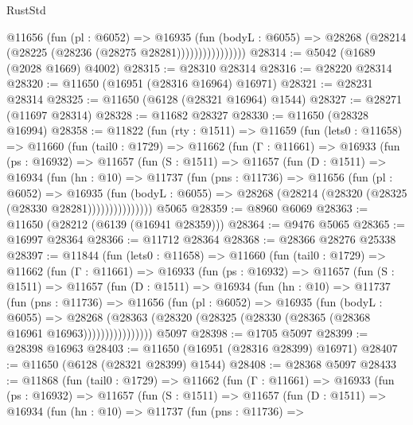 \begin{lexlean}{RustStd}
\begin{coremodule}
                      @11656
                        (fun (pl : @6052) =>
                        @16935
                          (fun (bodyL : @6055) =>
                          @28268 (@28214 (@28225 (@28236 (@28275 @28281))))))))))))))))
@28314 := @5042 (@1689 (@2028 @1669) @4002)
@28315 := @28310 @28314
@28316 := @28220 @28314
@28320 := @11650 (@16951 (@28316 @16964) @16971)
@28321 := @28231 @28314
@28325 := @11650 (@6128 (@28321 @16964) @1544)
@28327 := @28271 (@11697 @28314)
@28328 := @11682 @28327
@28330 := @11650 (@28328 @16994)
@28358 := @11822
    (fun (rty : @1511) =>
    @11659
      (fun (lets0 : @11658) =>
      @11660
        (fun (tail0 : @1729) =>
        @11662
          (fun (Γ : @11661) =>
          @16933
            (fun (ps : @16932) =>
            @11657
              (fun (S : @1511) =>
              @11657
                (fun (D : @1511) =>
                @16934
                  (fun (hn : @10) =>
                  @11737
                    (fun (pns : @11736) =>
                    @11656
                      (fun (pl : @6052) =>
                      @16935
                        (fun (bodyL : @6055) =>
                        @28268 (@28214 (@28320 (@28325 (@28330 @28281)))))))))))))))
    @5065
@28359 := @8960 @6069
@28363 := @11650 (@28212 (@6139 (@16941 @28359)))
@28364 := @9476 @5065
@28365 := @16997 @28364
@28366 := @11712 @28364
@28368 := @28366 @28276 @25338
@28397 := @11844
    (fun (lets0 : @11658) =>
    @11660
      (fun (tail0 : @1729) =>
      @11662
        (fun (Γ : @11661) =>
        @16933
          (fun (ps : @16932) =>
          @11657
            (fun (S : @1511) =>
            @11657
              (fun (D : @1511) =>
              @16934
                (fun (hn : @10) =>
                @11737
                  (fun (pns : @11736) =>
                  @11656
                    (fun (pl : @6052) =>
                    @16935
                      (fun (bodyL : @6055) =>
                      @28268
                        (@28363
                          (@28320 (@28325 (@28330 (@28365 (@28368 @16961 @16963))))))))))))))))
    @5097
@28398 := @1705 @5097
@28399 := @28398 @16963
@28403 := @11650 (@16951 (@28316 @28399) @16971)
@28407 := @11650 (@6128 (@28321 @28399) @1544)
@28408 := @28368 @5097
@28433 := @11868
    (fun (tail0 : @1729) =>
    @11662
      (fun (Γ : @11661) =>
      @16933
        (fun (ps : @16932) =>
        @11657
          (fun (S : @1511) =>
          @11657
            (fun (D : @1511) =>
            @16934
              (fun (hn : @10) =>
              @11737
                (fun (pns : @11736) =>

\end{coremodule}
\end{lexlean}
